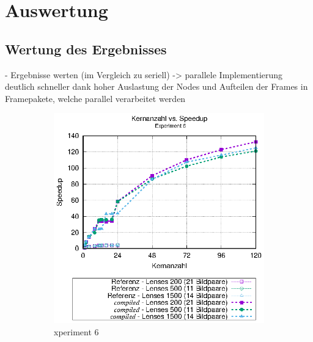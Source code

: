 \chapter{Auswertung}

\section{Wertung des Ergebnisses}

\begin{correctmore}
	- Ergebnisse werten (im Vergleich zu seriell)
	-> parallele Implementierung deutlich schneller dank hoher Auslastung der Nodes und Aufteilen der Frames in Framepakete, welche parallel verarbeitet werden
\end{correctmore}

\begin{center}
\begin{figure}[htbp]
	\begin{subfigure}[b]{0.45\textwidth}
		\centering
		\includegraphics[width=\textwidth]{pdf/best_speedup_exp6}
		\caption{xperiment 6}
		\label{fig:best_speedup_exp6}
	\end{subfigure}
	\hfill
	\begin{subfigure}[b]{0.45\textwidth}
		\centering

\end{subfigure}
\end{figure}
\end{center}
